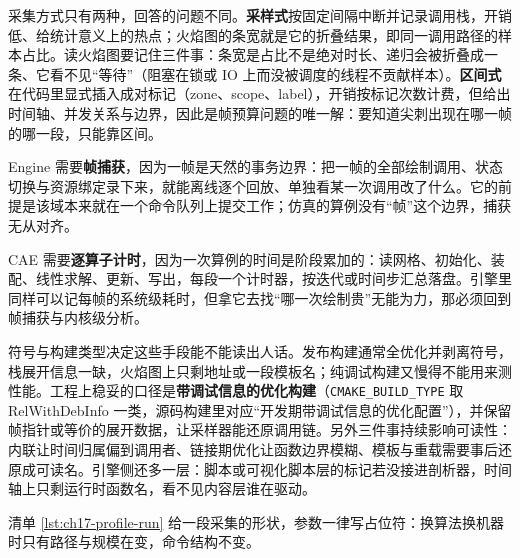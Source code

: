 \documentclass[12pt,a4paper,fontset=fandol]{ctexbook}
\newcommand{\Tp}[1]{\texttt{#1}}
\newcommand{\Lang}[1]{\textsf{#1}}
\newcommand{\DomCAE}{\Lang{CAE}}
\newcommand{\DomEngine}{\Lang{Engine}}
\begin{document}
采集方式只有两种，回答的问题不同。\textbf{采样式}按固定间隔中断并记录调用栈，开销低、给统计意义上的热点；火焰图的条宽就是它的折叠结果，即同一调用路径的样本占比。读火焰图要记住三件事：条宽是占比不是绝对时长、递归会被折叠成一条、它看不见``等待''（阻塞在锁或 IO 上而没被调度的线程不贡献样本）。\textbf{区间式}在代码里显式插入成对标记（zone、scope、label），开销按标记次数计费，但给出时间轴、并发关系与边界，因此是帧预算问题的唯一解：要知道尖刺出现在哪一帧的哪一段，只能靠区间。

\begin{compare}[title={帧捕获与逐算子计时：边界不同，手段就不通用}]
\DomEngine{} 需要\textbf{帧捕获}，因为一帧是天然的事务边界：把一帧的全部绘制调用、状态切换与资源绑定录下来，就能离线逐个回放、单独看某一次调用改了什么。它的前提是该域本来就在一个命令队列上提交工作；仿真的算例没有``帧''这个边界，捕获无从对齐。

\DomCAE{} 需要\textbf{逐算子计时}，因为一次算例的时间是阶段累加的：读网格、初始化、装配、线性求解、更新、写出，每段一个计时器，按迭代或时间步汇总落盘。引擎里同样可以记每帧的系统级耗时，但拿它去找``哪一次绘制贵''无能为力，那必须回到帧捕获与内核级分析。
\end{compare}

符号与构建类型决定这些手段能不能读出人话。发布构建通常全优化并剥离符号，栈展开信息一缺，火焰图上只剩地址或一段模板名；纯调试构建又慢得不能用来测性能。工程上稳妥的口径是\textbf{带调试信息的优化构建}（\Tp{CMAKE\_BUILD\_TYPE} 取 RelWithDebInfo 一类，源码构建里对应``开发期带调试信息的优化配置''），并保留帧指针或等价的展开数据，让采样器能还原调用链。另外三件事持续影响可读性：内联让时间归属偏到调用者、链接期优化让函数边界模糊、模板与重载需要事后还原成可读名。引擎侧还多一层：脚本或可视化脚本层的标记若没接进剖析器，时间轴上只剩运行时函数名，看不见内容层谁在驱动。

清单 \ref{lst:ch17-profile-run} 给一段采集的形状，参数一律写占位符：换算法换机器时只有路径与规模在变，命令结构不变。
\end{document}
